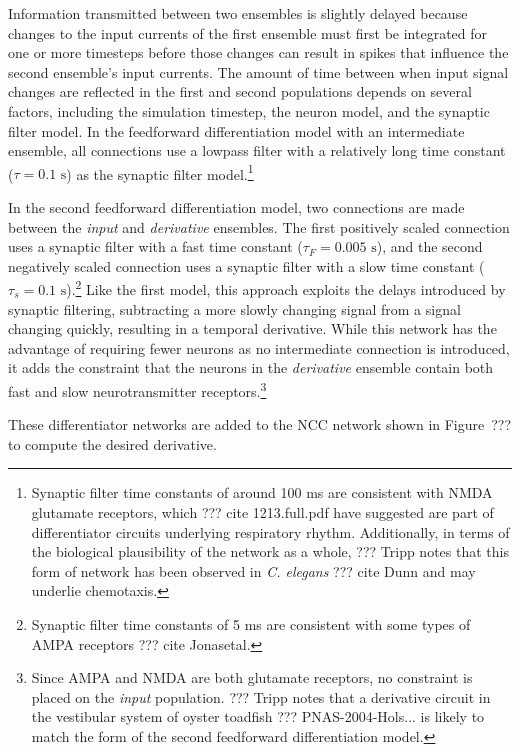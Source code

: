 Information transmitted between two ensembles
is slightly delayed
because changes to the input currents
of the first ensemble
must first be integrated for one or more
timesteps before those changes can result in
spikes that influence
the second ensemble's input currents.
The amount of time between
when input signal changes are reflected
in the first and second populations
depends on several factors,
including the simulation timestep,
the neuron model, and the synaptic filter model.
In the feedforward differentiation model
with an intermediate ensemble,
all connections use a lowpass filter
with a relatively long time constant
($\tau=0.1 \text{ s}$)
as the synaptic filter model.\footnote{
  Synaptic filter time constants of around 100 ms
  are consistent with NMDA glutamate receptors,
  which ??? cite 1213.full.pdf have suggested
  are part of differentiator circuits
  underlying respiratory rhythm.
  Additionally, in terms of
  the biological plausibility of the network as a whole,
  ??? Tripp notes that this form of network
  has been observed in \textit{C. elegans} ??? cite Dunn
  and may underlie chemotaxis.}

In the second feedforward differentiation model,
two connections are made between
the \textit{input} and \textit{derivative} ensembles.
The first positively scaled connection
uses a synaptic filter with a fast time constant
($\tau_F=0.005 \text{ s}$),
and the second negatively scaled connection
uses a synaptic filter with a slow time constant
($\tau_s=0.1 \text{ s}$).\footnote{
  Synaptic filter time constants of 5 ms
  are consistent with some types of
  AMPA receptors ??? cite Jonasetal.}
Like the first model,
this approach exploits the delays introduced
by synaptic filtering,
subtracting a more slowly changing signal
from a signal changing quickly,
resulting in a temporal derivative.
While this network has the advantage
of requiring fewer neurons
as no intermediate connection is introduced,
it adds the constraint that
the neurons in the \textit{derivative} ensemble
contain both fast and slow
neurotransmitter receptors.\footnote{
  Since AMPA and NMDA are both glutamate receptors,
  no constraint is placed on the \textit{input} population.
  ??? Tripp notes that a derivative circuit
  in the vestibular system of oyster toadfish
  ??? PNAS-2004-Hols...
  is likely to match the form of the second
  feedforward differentiation model.}

These differentiator networks
are added to the NCC network
shown in Figure~???
to compute the desired derivative.

